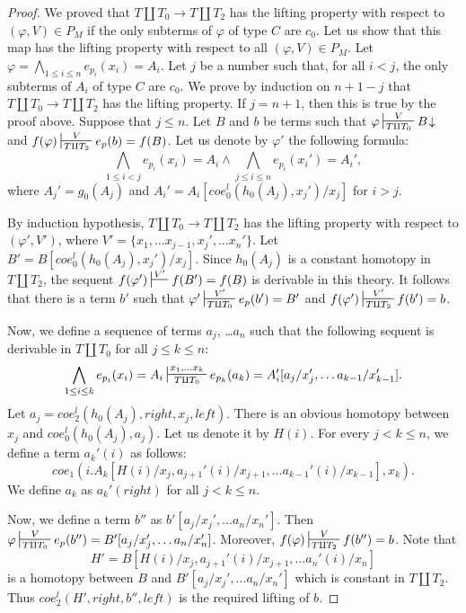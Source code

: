 \documentclass[reqno]{amsart}
\theoremstyle{definition}
\theoremstyle{remark}
\newcommand{\leftI}{\mathit{left}}
\newcommand{\rightI}{\mathit{right}}
\newcommand{\coe}{\mathit{coe}}
\numberwithin{figure}{section}
\begin{document}
\begin{proof}
We proved that $T \amalg T_0 \to T \amalg T_2$ has the lifting property with respect to $(\varphi,V) \in P_M$ if the only subterms of $\varphi$ of type $C$ are $c_0$.
Let us show that this map has the lifting property with respect to all $(\varphi,V) \in P_M$.
Let $\varphi = \bigwedge_{1 \leq i \leq n} e_{p_i}(x_i) = A_i$.
Let $j$ be a number such that, for all $i < j$, the only subterms of $A_i$ of type $C$ are $c_0$.
We prove by induction on $n + 1 - j$ that $T \amalg T_0 \to T \amalg T_2$ has the lifting property.
If $j = n + 1$, then this is true by the proof above.
Suppose that $j \leq n$.
Let $B$ and $b$ be terms such that $\varphi \sststile{T \amalg T_0}{V} B\!\downarrow$ and $f(\varphi) \sststile{T \amalg T_2}{V} e_p(b) = f(B)$.
Let us denote by $\varphi'$ the following formula:
\[ \bigwedge_{1 \leq i < j} e_{p_i}(x_i) = A_i \land \bigwedge_{j \leq i \leq n} e_{p_i}(x_i') = A_i', \]
where $A_j' = g_0(A_j)$ and $A_i' = A_i[\coe^l_0(h_0(A_j),x_j')/x_j]$ for $i > j$.

By induction hypothesis, $T \amalg T_0 \to T \amalg T_2$ has the lifting property with respect to $(\varphi',V')$, where $V' = \{ x_1, \ldots x_{j-1}, x_j', \ldots x_n' \}$.
Let $B' = B[\coe^l_0(h_0(A_j),x_j')/x_j]$.
Since $h_0(A_j)$ is a constant homotopy in $T \amalg T_2$, the sequent $f(\varphi') \sststile{}{V'} f(B') = f(B)$ is derivable in this theory.
It follows that there is a term $b'$ such that $\varphi' \sststile{T \amalg T_0}{V'} e_p(b') = B'$ and $f(\varphi') \sststile{T \amalg T_2}{V'} f(b') = b$.

Now, we define a sequence of terms $a_j$, \ldots $a_n$ such that the following sequent is derivable in $T \amalg T_0$ for all $j \leq k \leq n$:
\[ \bigwedge_{1 \leq i \leq k} e_{p_i}(x_i) = A_i \sststile{T \amalg T_0}{x_1, \ldots x_k} e_{p_k}(a_k) = A_i'[a_j/x_j', \ldots a_{k-1}/x_{k-1}']. \]
Let $a_j = \coe^l_2(h_0(A_j), \rightI, x_j, \leftI)$.
There is an obvious homotopy between $x_j$ and $\coe^l_0(h_0(A_j),a_j)$.
Let us denote it by $H(i)$.
For every $j < k \leq n$, we define a term $a_k'(i)$ as follows:
\[ \coe_1(i. A_k[H(i)/x_j, a_{j+1}'(i)/x_{j+1}, \ldots a_{k-1}'(i)/x_{k-1}], x_k). \]
We define $a_k$ as $a_k'(\rightI)$ for all $j < k \leq n$.

Now, we define a term $b''$ as $b'[a_j/x_j', \ldots a_n/x_n']$.
Then $\varphi \sststile{T \amalg T_0}{V} e_p(b'') = B'[a_j/x_j', \ldots a_n/x_n']$.
Moreover, $f(\varphi) \sststile{T \amalg T_2}{V} f(b'') = b$.
Note that
\[ H' = B[H(i)/x_j, a_{j+1}'(i)/x_{j+1}, \ldots a_n'(i)/x_n] \]
is a homotopy between $B$ and $B'[a_j/x_j', \ldots a_n/x_n']$ which is constant in $T \amalg T_2$.
Thus $\coe^l_2(H',\rightI,b'',\leftI)$ is the required lifting of $b$.
\end{proof}
\end{document}
